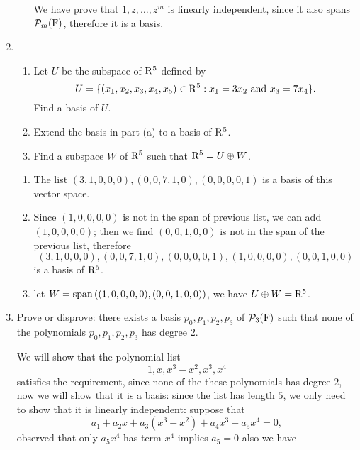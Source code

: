 \begin{enumerate}
\begin{solution}
\begin{enumerate}[label=(\alph*)]
                    We have prove that $1,z,\ldots,z^m$ is linearly independent, since it also spans $\mathcal{P}_m(\mathrm{F})$, therefore it is a basis.
            \end{enumerate}
        \end{solution}
    \item \begin{enumerate}[label=(\alph*)]
            \item Let $U$ be the subspace of $\mathrm{R}^5$ defined by 
                \[ U = \{(x_1,x_2,x_3,x_4,x_5) \in \mathrm{R}^5:x_1=3x_2 \text{ and } x_3=7x_4\}.\]
                Find a basis of $U$.
            \item Extend the basis in part (a) to a basis of $\mathrm{R}^5$.
            \item Find a subspace $W$ of $\mathrm{R}^5$ such that $\mathrm{R}^5 = U \oplus W$.
        \end{enumerate}
        \begin{solution}
            \begin{enumerate}[label=(\alph*)]
                \item The list $(3,1,0,0,0),(0,0,7,1,0), (0,0,0,0,1)$ is a basis of this vector space.
                \item Since $(1,0,0,0,0)$ is not in the span of previous list, we can add $(1,0,0,0,0)$; then we find $(0,0,1,0,0)$ is not in the 
                    span of the previous list, therefore 
                    \[(3,1,0,0,0), (0,0,7,1,0),(0,0,0,0,1),(1,0,0,0,0),(0,0,1,0,0)\]
                    is a basis of $\mathrm{R}^5$.
                \item let $W = \text{span}\left((1,0,0,0,0), (0,0,1,0,0)\right)$, we have $U \oplus W = \mathrm{R}^5$.
            \end{enumerate}
        \end{solution}
    \item Prove or disprove: there exists a basis $p_0, p_1, p_2, p_3$ of $\mathcal{P}_3(\mathrm{F})$ such that none of the polynomials $p_0, p_1, p_2, p_3$ has 
        degree $2$.
        \begin{solution}
            We will show that the polynomial list 
            \[ 1, x, x^3-x^2, x^3, x^4 \]
            satisfies the requirement, since none of the these polynomials has degree $2$, now we will show that it is a basis:
            since the list has length $5$, we only need to show that it is linearly independent: suppose that 
            \[ a_1 + a_2x + a_3(x^3-x^2) + a_4x^3 + a_5x^4 = 0,\]
            observed that only $a_5x^4$ has term $x^4$ implies $a_5 = 0$ also we have 

\end{solution}
\end{enumerate}
